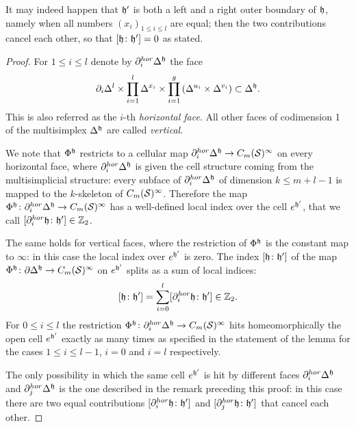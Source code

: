 It may indeed happen that $\mathfrak{h}'$ is both a left and a right outer boundary of $\mathfrak{h}$,
namely when all numbers $(x_i)_{1\leq i\leq l}$ are equal; then the two contributions cancel each other,
so that $[\mathfrak{h}\colon\mathfrak{h}']=0$ as stated.
\begin{proof}
 For $1\leq i\leq l$ denote by $\partial^{hor}_i\Delta^{\mathfrak{h}}$ the face
 \[
 \partial_i\Delta^l\times\prod_{i=1}^l\Delta^{x_i}\times\prod_{i=1}^g\left(\Delta^{u_i}\times\Delta^{v_i}\right)\subset\Delta^{\mathfrak{h}}.
 \]
 This is also referred as the $i$-th \emph{horizontal face}. All other faces of codimension 1 of
 the multisimplex $\Delta^{\mathfrak{h}}$ are called \emph{vertical}.
 
 We note that $\Phi^{\mathfrak{h}}$ restricts to a cellular map $\partial_i^{hor}\Delta^{\mathfrak{h}}\to C_m(\mathcal{S})^{\infty}$ on every
 horizontal face, where $\partial_i^{hor}\Delta^{\mathfrak{h}}$
 is given the cell structure coming from the multisimplicial structure: every subface of $\partial_i^{hor}\Delta^{\mathfrak{h}}$ of dimension
 $k\leq m+l-1$ is mapped to the $k$-skeleton of $C_m(\mathcal{S})^{\infty}$. Therefore the map $\Phi^{\mathfrak{h}}\colon\partial_i^{hor}\Delta^{\mathfrak{h}}\to C_m(\mathcal{S})^{\infty}$
 has a well-defined local index over the cell $e^{\mathfrak{h}'}$, that
 we call $[\partial^{hor}_i\mathfrak{h}\colon\mathfrak{h}']\in\mathbb{Z}_2$.

 The same holds for vertical faces, where the restriction of $\Phi^{\mathfrak{h}}$ is the constant map to $\infty$: in this case the local index
 over $e^{\mathfrak{h}'}$ is zero. The index $[\mathfrak{h}\colon\mathfrak{h}']$ of the map $\Phi^{\mathfrak{h}}\colon\partial\Delta^{\mathfrak{h}}\to C_m(\mathcal{S})^{\infty}$ on
 $e^{\mathfrak{h}'}$ splits as a sum of local indices:
 \[
  [\mathfrak{h}\colon\mathfrak{h}']=\sum_{i=0}^l[\partial_i^{hor}\mathfrak{h}\colon\mathfrak{h}']\in\mathbb{Z}_2.
 \]
 For $0\leq i\leq l$ the restriction $\Phi^{\mathfrak{h}}\colon\partial^{hor}_i\Delta^{\mathfrak{h}}\to C_m(\mathcal{S})^{\infty}$
 hits homeomorphically the open cell $e^{\mathfrak{h}'}$
 exactly as many times as specified in the statement
 of the lemma for the cases $1\leq i\leq l-1$,
 $i=0$ and $i=l$ respectively.
 
 The only possibility in which the same cell $e^{\mathfrak{h}'}$ is hit by different faces $\partial_i^{hor}\Delta^{\mathfrak{h}}$
 and $\partial_j^{hor}\Delta^{\mathfrak{h}}$ is the one described in the remark preceding this proof: in this case
 there are two equal contributions $[\partial_i^{hor}\mathfrak{h}\colon\mathfrak{h}']$ and $[\partial_j^{hor}\mathfrak{h}\colon\mathfrak{h}']$
 that cancel each other.
\end{proof}

